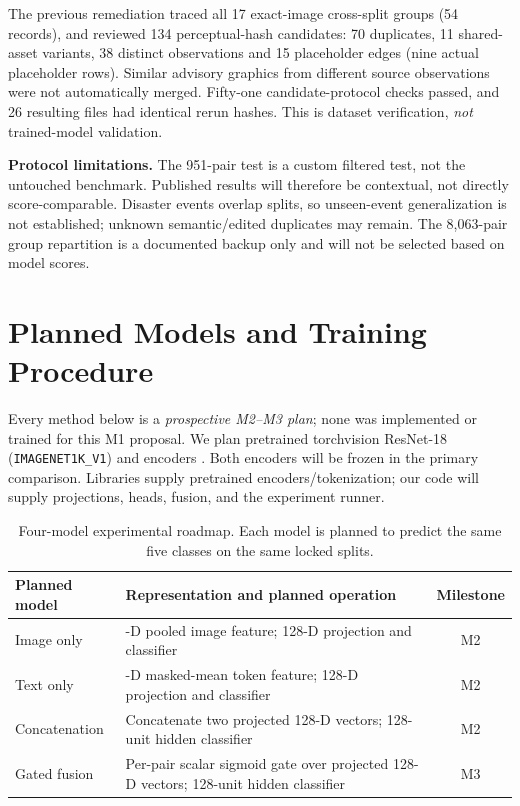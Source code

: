 \documentclass[11pt,a4paper]{article}
\begin{document}
The previous remediation traced all 17 exact-image cross-split groups (54 records), and reviewed 134 perceptual-hash candidates: 70 duplicates, 11 shared-asset variants, 38 distinct observations and 15 placeholder edges (nine actual placeholder rows). Similar advisory graphics from different source observations were not automatically merged. Fifty-one candidate-protocol checks passed, and 26 resulting files had identical rerun hashes. This is dataset verification, \emph{not} trained-model validation.

\textbf{Protocol limitations.} The 951-pair test is a custom filtered test, not the untouched benchmark. Published results will therefore be contextual, not directly score-comparable. Disaster events overlap splits, so unseen-event generalization is not established; unknown semantic/edited duplicates may remain. The 8,063-pair group repartition is a documented backup only and will not be selected based on model scores.

\section{Planned Models and Training Procedure}
Every method below is a \emph{prospective M2--M3 plan}; none was implemented or trained for this M1 proposal. We plan pretrained torchvision ResNet-18 (\texttt{IMAGENET1K\_V1}) and  encoders \cite{torchvision,distilbert}. Both encoders will be frozen in the primary comparison. Libraries supply pretrained encoders/tokenization; our code will supply projections, heads, fusion, and the experiment runner.

\begin{table}[htbp]
\centering\small
\caption{Four-model experimental roadmap. Each model is planned to predict the same five classes on the same locked splits.}
\label{tab:models}
\begin{tabularx}{\linewidth}{@{}l>{\raggedright\arraybackslash}Xc@{}}
\toprule
Planned model & Representation and planned operation & Milestone \\
\midrule
Image only & 512-D pooled image feature; 128-D projection and classifier & M2 \\
Text only & 768-D masked-mean token feature; 128-D projection and classifier & M2 \\
Concatenation & Concatenate two projected 128-D vectors; 128-unit hidden classifier & M2 \\
Gated fusion & Per-pair scalar sigmoid gate over projected 128-D vectors; 128-unit hidden classifier & M3 \\
\bottomrule
\end{tabularx}
\end{table}
\end{document}
